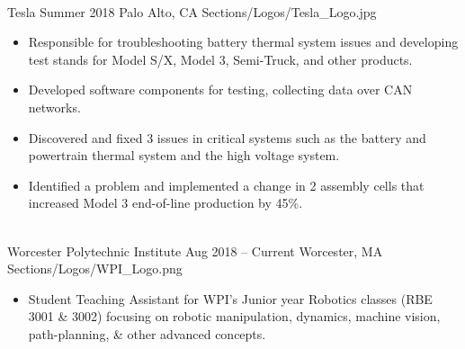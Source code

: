 \divider \\
    {Tesla}
    {Summer 2018}
    {Palo Alto, CA}
    {Sections/Logos/Tesla_Logo.jpg}
    \begin{itemize}
        \item Responsible for troubleshooting battery thermal system issues and developing test stands for Model S/X, Model 3, Semi-Truck, and other products.
        \item Developed software components for testing, collecting data over CAN networks.
        \item Discovered and fixed 3 issues in critical systems such as the battery and powertrain thermal system and the high voltage system.
        \item Identified a problem and implemented a change in 2 assembly cells that increased Model 3 end-of-line production by 45\%.
    \end{itemize}
\divider \\
    {Worcester Polytechnic Institute}
    {Aug 2018 -- Current}
    {Worcester, MA}
    {Sections/Logos/WPI_Logo.png}
    \begin{itemize}
        \item Student Teaching Assistant for WPI’s Junior year Robotics classes (RBE 3001 \& 3002) focusing on robotic manipulation, dynamics, machine vision, path-planning, \& other advanced concepts.
    \end{itemize}

